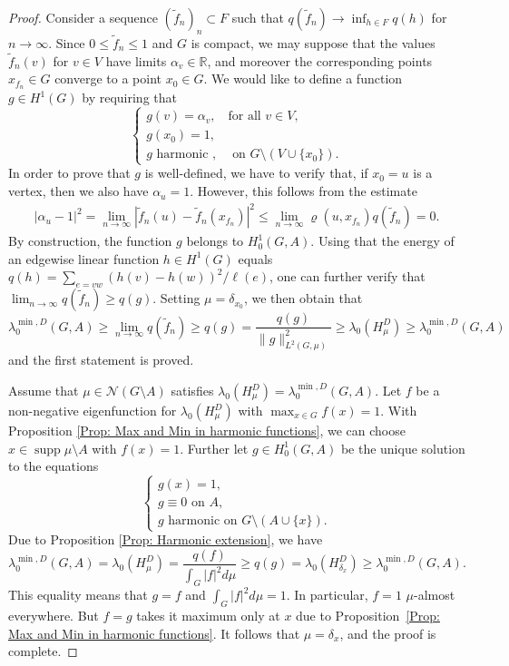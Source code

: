 \documentclass[reqno]{amsart}
\theoremstyle{plain}
\theoremstyle{definition}
\theoremstyle{remark}
\numberwithin{equation}{section}
\newcommand{\R}{\mathbb{R}}     %
\newcommand{\cN}{\mathcal{N}}
\newcommand{\supp}{\operatorname{supp}}
\begin{document}
\begin{proof}
Consider a sequence $(\widetilde f_n )_n \subset F$ such that $q( \widetilde f_n ) \to \inf_{h \in F} q(h)$ for $n \to \infty$. Since $0 \le \widetilde f_n \le 1$ and $G$ is compact, we may suppose that the values $\widetilde f_n (v)$ for $v \in V$ have limits $\alpha_v \in \R$, and moreover the corresponding points $x_{f_n} \in G$ converge to a point $x_0 \in G$. We would like to define a function $g \in H^1(G)$ by requiring that
\[
\begin{cases}
	g(v) = \alpha_v, & \text{for all $v \in V$}, \\
	g(x_0) = 1, \\
	g \text{ harmonic }, & \text{ on } G\setminus (V \cup \{x_0\} ).
\end{cases}
\]
In order to prove that $g$ is well-defined, we have to verify that, if $x_0 = u$ is a vertex, then we also have $\alpha_u = 1$. However, this follows from the estimate
\begin{align*}
	|\alpha_u - 1|^2 = \lim_{n \to\infty} | \widetilde f_n (u) - \widetilde f_n (x_{f_n}) |^2 \le  \lim_{n \to\infty} \varrho(u, x_{f_n}) q(  \widetilde f_n ) = 0.
\end{align*}
By construction, the function $g$ belongs to $H^1_0(G,A)$. Using that the energy of an edgewise linear function $h \in H^1(G)$ equals $q(h) = \sum_{e = vw} (h(v)-h(w))^2/\ell(e)$, one can further verify that $\lim_{n \to \infty} q( \widetilde f_n ) \ge q(g)$.
Setting $\mu= \delta_{x_0}$, we then obtain that
\[
\lambda^{\min, D}_0(G,A) \ge  \lim_{n \to \infty} q( \widetilde f_n ) \ge q(g) = \frac{q(g)}{\|g\|^2_{L^2(G, \mu)}} \ge \lambda_0 (H_{\mu}^D) \ge \lambda^{\min, D}_0(G,A)
\] 
and the first statement is proved.

Assume that $\mu \in \cN(G\setminus A)$ satisfies $\lambda_0(H_\mu^D) = \lambda_{0}^{\min, D}(G,A)$. Let $f$ be a non-negative eigenfunction for $\lambda_0(H_\mu^D)$ with $\max_{x\in G} f(x) = 1$. With Proposition \ref{Prop: Max and Min in harmonic functions}, we can choose $x \in \supp \mu\setminus A$ with $f(x)=1$. Further let $g \in H^1_0(G, A)$ be the unique solution to the equations
\[
\begin{cases}
	g(x) = 1, \\
	g \equiv 0\text{ on $A$},\\
	g \text{ harmonic on } G\setminus (A\cup \{x\}).
\end{cases}
\]
Due to Proposition \ref{Prop: Harmonic extension}, we have 
\[
\lambda_{0}^{\min, D}(G,A) = \lambda_0(H_\mu^D) = \frac{q(f)}{\int_G |f|^2 d\mu} \geq q(g) = \lambda_0(H_{\delta_x}^D) \geq \lambda_0^{\min, D}(G,A). \]
This equality means that $g = f$ and $\int_G |f|^2 d\mu = 1$. In particular, $f= 1$ $\mu$-almost everywhere. But $f=g$ takes it maximum only at $x$ due to Proposition~\ref{Prop: Max and Min in harmonic functions}. It follows that $\mu = \delta_x$, and the proof is complete.
\end{proof}
\end{document}
